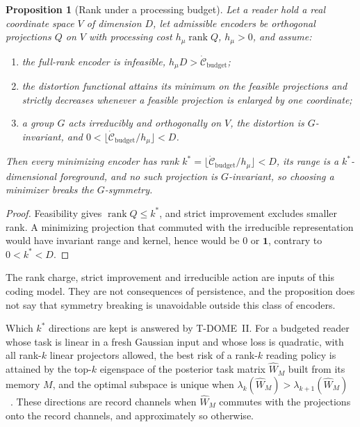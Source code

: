 \documentclass[12pt]{article}
\newtheorem{proposition}[theorem]{Proposition}
\theoremstyle{definition}
\theoremstyle{remark}
\begin{document}
\begin{proposition}[Rank under a processing budget]\label{prop:budget}
Let a reader hold a real coordinate space \(V\) of dimension \(D\), let admissible
encoders be orthogonal projections \(Q\) on \(V\) with processing cost
\(h_\mu\operatorname{rank}Q\), \(h_\mu>0\), and assume:
\begin{enumerate}[label=(\arabic*),leftmargin=2em]
\item the full-rank encoder is infeasible, \(h_\mu D>\dot{\mathcal C}_{\mathrm{budget}}\);
\item the distortion functional attains its minimum on the feasible projections and
  strictly decreases whenever a feasible projection is enlarged by one coordinate;
\item a group \(G\) acts irreducibly and orthogonally on \(V\), the distortion is
  \(G\)-invariant, and \(0<\lfloor\dot{\mathcal C}_{\mathrm{budget}}/h_\mu\rfloor<D\).
\end{enumerate}
Then every minimizing encoder has rank
\(k^*=\lfloor\dot{\mathcal C}_{\mathrm{budget}}/h_\mu\rfloor<D\), its range is a
\(k^*\)-dimensional foreground, and no such projection is \(G\)-invariant, so choosing a
minimizer breaks the \(G\)-symmetry.
\end{proposition}

\begin{proof}
Feasibility gives \(\operatorname{rank}Q\le k^*\), and strict improvement excludes
smaller rank. A minimizing projection that commuted with the irreducible representation
would have invariant range and kernel, hence would be \(0\) or \(\mathbf 1\), contrary
to \(0<k^*<D\).
\end{proof}

The rank charge, strict improvement and irreducible action are inputs of this coding
model. They are not consequences of persistence, and the proposition does not say that
symmetry breaking is unavoidable outside this class of encoders.

Which \(k^*\) directions are kept is answered by T-DOME~II. For a budgeted reader whose
task is linear in a fresh Gaussian input and whose loss is quadratic, with
all rank-\(k\) linear projectors allowed, the best risk of a rank-\(k\) reading policy is
attained by the top-\(k\) eigenspace of the posterior task matrix \(\widehat W_M\)
built from its memory \(M\), and the optimal subspace is unique when
\(\lambda_k(\widehat W_M)>\lambda_{k+1}(\widehat W_M)\)~\cite{TDOMEII}. These directions are
record channels when \(\widehat W_M\) commutes with the projections onto the record
channels, and approximately so otherwise.
\end{document}
